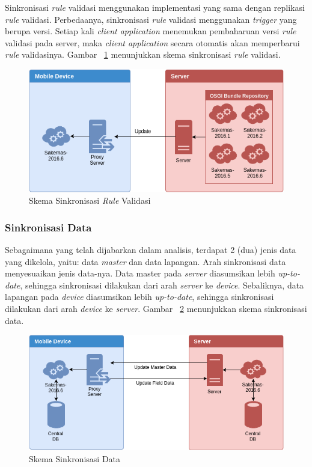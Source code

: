 Sinkronisasi \textit{rule} validasi menggunakan implementasi yang sama dengan replikasi \textit{rule} validasi. Perbedaanya, sinkronisasi \textit{rule} validasi menggunakan \textit{trigger} yang berupa versi. Setiap kali \textit{client application} menemukan pembaharuan versi \textit{rule} validasi pada server, maka \textit{client application} secara otomatis akan memperbarui \textit{rule} validasinya. Gambar ~\ref{fig:architecture-rule-synchronization} menunjukkan skema sinkronisasi \textit{rule} validasi.

\begin{figure}[h]
    \centering
    \includegraphics[width=.93\textwidth]{../../Resources/Images/architecture-rule-synchronization}
    \caption{Skema Sinkronisasi \textit{Rule} Validasi}
    \label{fig:architecture-rule-synchronization}
\end{figure}


\subsubsection{Sinkronisasi Data}

Sebagaimana yang telah dijabarkan dalam analisis, terdapat 2 (dua) jenis data yang dikelola, yaitu: data \textit{master} dan data lapangan. Arah sinkronisasi data menyesuaikan jenis data-nya. Data master pada \textit{server} diasumsikan lebih \textit{up-to-date}, sehingga sinkronisasi dilakukan dari arah \textit{server} ke \textit{device}. Sebaliknya, data lapangan pada \textit{device} diasumsikan lebih \textit{up-to-date}, sehingga sinkronisasi dilakukan dari arah \textit{device} ke \textit{server}. Gambar ~\ref{fig:architecture-data-synchronization} menunjukkan skema sinkronisasi data.

\begin{figure}[h]
    \centering
    \includegraphics[width=.93\textwidth]{../../Resources/Images/architecture-data-synchronization}
    \caption{Skema Sinkronisasi Data}
    \label{fig:architecture-data-synchronization}
\end{figure}


